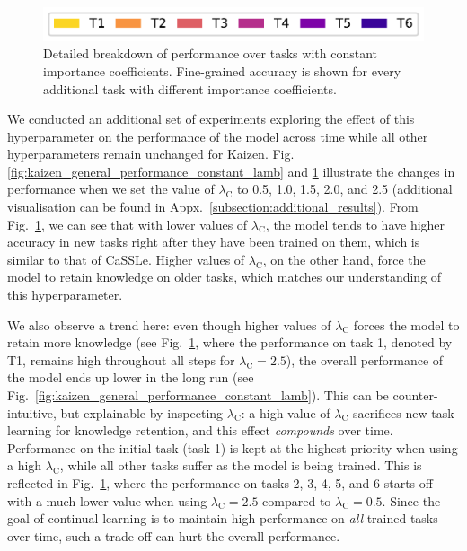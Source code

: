 \begin{figure}[ht]
    \vspace{-0.05in}
    \includegraphics[width=0.65 \linewidth ]{figures_new/Part_1/F4-WISDM2019-6Tasks-v2_legend.pdf}
    \vspace{-0.1in}
    \caption{Detailed breakdown of performance over tasks with constant importance coefficients. Fine-grained accuracy is shown for every additional task with different importance coefficients.}
    \label{fig:kaizen_performance_per_task_constant_lamb}
\end{figure}

We conducted an additional set of experiments exploring the effect of this hyperparameter on the performance of the model across time while all other hyperparameters remain unchanged for Kaizen. Fig. \ref{fig:kaizen_general_performance_constant_lamb} and \ref{fig:kaizen_performance_per_task_constant_lamb} illustrate the changes in performance when we set the value of $\lambda_{\mathrm{C}}$ to 0.5, 1.0, 1.5, 2.0, and 2.5 (additional visualisation can be found in Appx.~\ref{subsection:additional_results}). From Fig.~\ref{fig:kaizen_performance_per_task_constant_lamb}, we can see that with lower values of $\lambda_{\mathrm{C}}$, the model tends to have higher accuracy in new tasks right after they have been trained on them, which is similar to that of CaSSLe. Higher values of $\lambda_{\mathrm{C}}$, on the other hand, force the model to retain knowledge on older tasks, which matches our understanding of this hyperparameter.

We also observe a trend here: even though higher values of $\lambda_{\mathrm{C}}$ forces the model to retain more knowledge (see Fig.~\ref{fig:kaizen_performance_per_task_constant_lamb}, where the performance on task 1, denoted by T1, remains high throughout all steps for $\lambda_{\mathrm{C}}=2.5$), the overall performance of the model ends up lower in the long run (see Fig.~\ref{fig:kaizen_general_performance_constant_lamb}). This can be counter-intuitive, but explainable by inspecting $\lambda_{\mathrm{C}}$: a high value of $\lambda_{\mathrm{C}}$ sacrifices new task learning for knowledge retention, and this effect \emph{compounds} over time. Performance on the initial task (task 1) is kept at the highest priority when using a high $\lambda_{\mathrm{C}}$, while all other tasks suffer as the model is being trained. This is reflected in Fig.~\ref{fig:kaizen_performance_per_task_constant_lamb}, where the performance on tasks 2, 3, 4, 5, and 6 starts off with a much lower value when using $\lambda_{\mathrm{C}}=2.5$ compared to $\lambda_{\mathrm{C}}=0.5$. Since the goal of continual learning is to maintain high performance on \emph{all} trained tasks over time, such a trade-off can hurt the overall performance.

